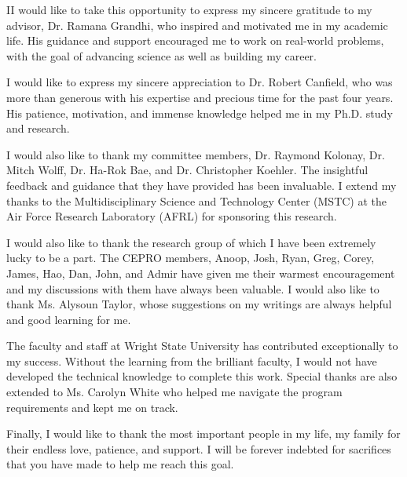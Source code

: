 \documentclass[12pt]{report}
\begin{document}
II would like to take this opportunity to express my sincere gratitude to my advisor, Dr. Ramana Grandhi, who inspired and motivated me in my academic life. His guidance and support encouraged me to work on real-world problems, with the goal of advancing science as well as building my career.

\setlength{\parindent}{2em}
I would like to express my sincere appreciation to Dr. Robert Canfield, who was more than generous with his expertise and precious time for the past four years. His patience, motivation, and immense knowledge helped me in my Ph.D. study and research.

I would also like to thank my committee members, Dr. Raymond Kolonay, Dr. Mitch Wolff, Dr. Ha-Rok Bae, and Dr. Christopher Koehler. The insightful feedback and guidance that they have provided has been invaluable. I extend my thanks to the Multidisciplinary Science and Technology Center (MSTC) at the Air Force Research Laboratory (AFRL) for sponsoring this research.

I would also like to thank the research group of which I have been extremely lucky to be a part. The CEPRO members, Anoop, Josh, Ryan, Greg, Corey, James, Hao, Dan, John, and Admir have given me their warmest encouragement and my discussions with them have always been valuable. I would also like to thank Ms. Alysoun Taylor, whose suggestions on my writings are always helpful and good learning for me.

The faculty and staff at Wright State University has contributed exceptionally to my success. Without the learning from the brilliant faculty, I would not have developed the technical knowledge to complete this work. Special thanks are also extended to Ms. Carolyn White who helped me navigate the program requirements and kept me on track.

Finally, I would like to thank the most important people in my life, my family for their endless love, patience, and support. I will be forever indebted for sacrifices that you have made to help me reach this goal.
\end{document}
